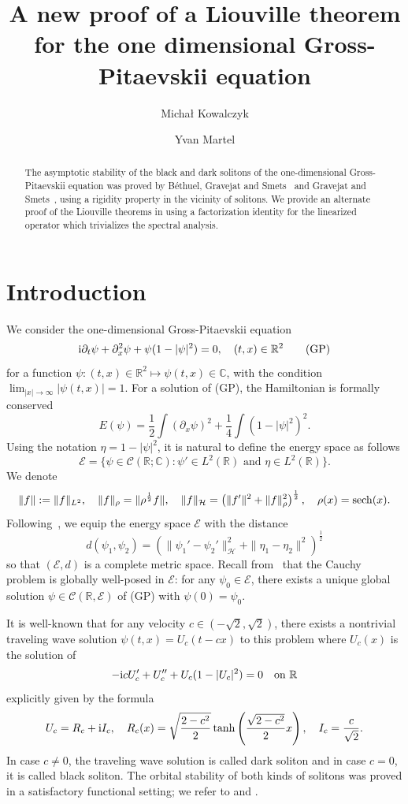 \documentclass[11pt]{amsart}
\title[Liouville theorem for 1D Gross-Pitaevskii equation]
{A new proof of a Liouville theorem for the one dimensional Gross-Pitaevskii equation}
\author{Micha{\l} Kowalczyk}
\author{Yvan Martel}
\theoremstyle{remark}
\newcommand\RR{\mathbb{R}}
\newcommand\CC{\mathbb{C}}
\newcommand\cC{\mathcal{C}}
\newcommand\cE{\mathcal{E}}
\newcommand\cH{\mathcal{H}}
\newcommand\ii{\textnormal{i}}
\begin{document}
\begin{abstract}
The asymptotic stability of the black and dark solitons of the one-dimensional 
Gross-Pitaevskii equation was proved by Béthuel, Gravejat and Smets~\cite{BGS1}
and Gravejat and Smets~\cite{GS15}, using a rigidity property 
in the vicinity of solitons.
We provide an alternate proof of the Liouville theorems in \cite{BGS1,GS15} using a factorization
identity for the linearized operator which trivializes the spectral analysis.
\end{abstract}

\maketitle



\section{Introduction}

We consider the one-dimensional Gross-Pitaevskii equation
\begin{equation*}
\ii\partial_t\psi+\partial_x^2 \psi+\psi (1-|\psi|^2)=0,\quad (t,x)\in \RR^2
\tag{GP}
\end{equation*}
for a function $\psi:(t,x)\in\RR^2\mapsto \psi(t,x)\in \CC$, with the condition
$\lim_{|x|\to\infty} |\psi(t,x)|=1$.
For a solution of (GP), the Hamiltonian is formally conserved
\[
E (\psi)=\frac12\int(\partial_x\psi)^2+\frac14\int(1-|\psi|^2)^2.
\]
Using the notation $\eta = 1-|\psi|^2$, it is natural to define the energy space
as follows
\[
\cE = \{ \psi \in \cC( \RR ; \CC ): \psi'\in L^2(\RR) \mbox{ and } \eta \in L^2(\RR)\}.
\]
We denote
\[
\|f\|:=\|f\|_{L^2},\quad \|f\|_\rho=\|\rho^\frac12 f\|,
\quad \|f\|_\cH=\left(\|f'\|^2 + \|f\|_\rho^2\right)^\frac12
,\quad \rho(x)=\sech(x).
\]
Following~\cite{GS15}, we equip the energy space $\cE$ with the distance
\[
d(\psi_1,\psi_2)= \left(\|\psi_1'-\psi_2'\|_\cH^2+\|\eta_1-\eta_2\|^2\right)^\frac12
\]
so that $(\cE,d)$ is a complete metric space. Recall from~\cite{Ge08,GS15,Zh01} that the Cauchy problem
is globally well-posed in $\cE$: for any $\psi_0\in \cE$, there exists
a unique global solution $\psi\in \cC(\RR,\cE)$ of (GP) with $\psi(0)=\psi_0$.

It is well-known that for any velocity $c\in (-\sqrt{2},\sqrt{2})$, there exists a nontrivial traveling wave solution $\psi(t,x)=U_c(t-cx)$ to this problem where $U_c(x)$ is the solution of
\[
-\ii cU_c'+U_c''+U_c(1-|U_c|^2)=0 \quad \hbox{on $\RR$}
\]
explicitly given by the formula
\[
U_c=R_c+\ii I_c,\quad 
R_c(x)=\sqrt{\frac{2-c^2}{2}} \tanh\left(\frac{\sqrt{2-c^2}}{2} x\right),\quad
I_c= \frac{c}{\sqrt{2}}.
\]
In case $c\neq 0$, the traveling wave solution is called dark soliton and in case $c=0$, it is called black soliton. 
The orbital stability of both kinds of solitons was proved in a satisfactory
functional setting; we refer to \cite[Theorem 1]{BGS1} and \cite[Theorem 1]{GS15}.
\end{document}
